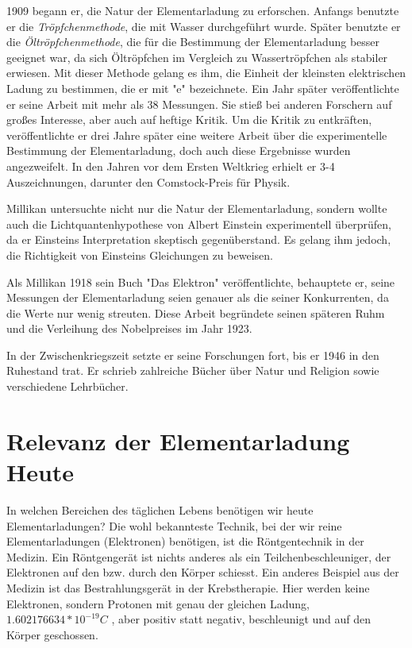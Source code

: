 1909 begann er, die Natur der Elementarladung zu erforschen. Anfangs benutzte er die \textit{Tröpfchenmethode}, die mit Wasser durchgeführt wurde. Später benutzte er die \textit{Öltröpfchenmethode}, die für die Bestimmung der Elementarladung besser geeignet war, da sich Öltröpfchen im Vergleich zu Wassertröpfchen als stabiler erwiesen.  Mit dieser Methode gelang es ihm, die Einheit der kleinsten elektrischen Ladung zu bestimmen, die er mit "e" bezeichnete. Ein Jahr später veröffentlichte er seine Arbeit mit mehr als 38 Messungen. Sie stieß bei anderen Forschern auf großes Interesse, aber auch auf heftige Kritik. Um die Kritik zu entkräften, veröffentlichte er drei Jahre später eine weitere Arbeit über die experimentelle Bestimmung der Elementarladung, doch auch diese Ergebnisse wurden angezweifelt. In den Jahren vor dem Ersten Weltkrieg erhielt er 3-4 Auszeichnungen, darunter den Comstock-Preis für Physik.

Millikan untersuchte nicht nur die Natur der Elementarladung, sondern wollte auch die Lichtquantenhypothese von Albert {\sc Einstein} experimentell überprüfen, da er Einsteins Interpretation skeptisch gegenüberstand. Es gelang ihm jedoch, die Richtigkeit von Einsteins Gleichungen zu beweisen.

Als Millikan 1918 sein Buch "Das Elektron" veröffentlichte, behauptete er, seine Messungen der Elementarladung seien genauer als die seiner Konkurrenten, da die Werte nur wenig streuten. Diese Arbeit begründete seinen späteren Ruhm und die Verleihung des Nobelpreises im Jahr 1923. 

In der Zwischenkriegszeit setzte er seine Forschungen fort, bis er 1946 in den Ruhestand trat. Er schrieb zahlreiche Bücher über Natur und Religion sowie verschiedene Lehrbücher. \parencite[vgl.][Millikan]{dewiki:247237013}

\section{Relevanz der Elementarladung Heute}\label{sec:relevanz}
In welchen Bereichen des täglichen Lebens benötigen wir heute Elementarladungen? Die wohl bekannteste Technik, bei der wir reine Elementarladungen (Elektronen) benötigen, ist die Röntgentechnik in der Medizin. Ein Röntgengerät ist nichts anderes als ein Teilchenbeschleuniger, der Elektronen auf den bzw. durch den Körper schiesst. Ein anderes Beispiel aus der Medizin ist das Bestrahlungsgerät in der Krebstherapie. Hier werden keine Elektronen, sondern Protonen mit genau der gleichen Ladung, $1.602176634 * 10^{-19} C$ \parencite[123]{fundamentum_mathe}, aber positiv statt negativ, beschleunigt und auf den Körper geschossen. 

